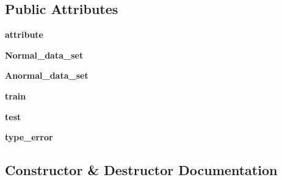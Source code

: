 \subsection*{Public Attributes}
\begin{DoxyCompactItemize}
\item 
{\bfseries attribute}\hypertarget{classSAD_1_1Stream__Generator_1_1Dataset__Generator_1_1Dataset__Generator_ae797910a2d2eccde0a4e7b7532e70efd}{}\label{classSAD_1_1Stream__Generator_1_1Dataset__Generator_1_1Dataset__Generator_ae797910a2d2eccde0a4e7b7532e70efd}

\item 
{\bfseries Normal\+\_\+data\+\_\+set}\hypertarget{classSAD_1_1Stream__Generator_1_1Dataset__Generator_1_1Dataset__Generator_a1227628193348bedbff73702c2feb623}{}\label{classSAD_1_1Stream__Generator_1_1Dataset__Generator_1_1Dataset__Generator_a1227628193348bedbff73702c2feb623}

\item 
{\bfseries Anormal\+\_\+data\+\_\+set}\hypertarget{classSAD_1_1Stream__Generator_1_1Dataset__Generator_1_1Dataset__Generator_a60eeb9eb166ef7a13c71bf1aba7ce9a1}{}\label{classSAD_1_1Stream__Generator_1_1Dataset__Generator_1_1Dataset__Generator_a60eeb9eb166ef7a13c71bf1aba7ce9a1}

\item 
{\bfseries train}\hypertarget{classSAD_1_1Stream__Generator_1_1Dataset__Generator_1_1Dataset__Generator_aede62d4b644010a0f45b0f633c3fc88c}{}\label{classSAD_1_1Stream__Generator_1_1Dataset__Generator_1_1Dataset__Generator_aede62d4b644010a0f45b0f633c3fc88c}

\item 
{\bfseries test}\hypertarget{classSAD_1_1Stream__Generator_1_1Dataset__Generator_1_1Dataset__Generator_af99150065cc9eea9d2b4a10f31138b4d}{}\label{classSAD_1_1Stream__Generator_1_1Dataset__Generator_1_1Dataset__Generator_af99150065cc9eea9d2b4a10f31138b4d}

\item 
{\bfseries type\+\_\+error}\hypertarget{classSAD_1_1Stream__Generator_1_1Dataset__Generator_1_1Dataset__Generator_a35016c0d5eb7228b837c9e1913d40c50}{}\label{classSAD_1_1Stream__Generator_1_1Dataset__Generator_1_1Dataset__Generator_a35016c0d5eb7228b837c9e1913d40c50}

\end{DoxyCompactItemize}


\subsection{Constructor \& Destructor Documentation}
